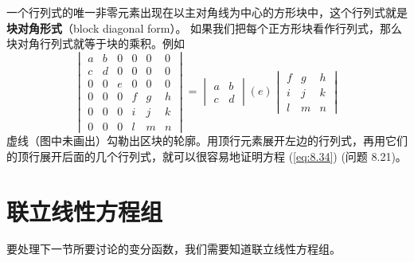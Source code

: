     一个行列式的唯一非零元素出现在以主对角线为中心的方形块中，这个行列式就是\textbf{块对角形式}（block diagonal form）。 如果我们把每个正方形块看作行列式，那么块对角行列式就等于块的乘积。例如
    \begin{equation}
        \begin{vmatrix}
            a & b & 0 & 0 & 0 & 0 \\
            c & d & 0 & 0 & 0 & 0 \\
            0 & 0 & e & 0 & 0 & 0 \\
            0 & 0 & 0 & f & g & h \\
            0 & 0 & 0 & i & j & k \\
            0 & 0 & 0 & l & m & n
        \end{vmatrix} = \begin{vmatrix}
            a & b \\
            c & d
        \end{vmatrix} \left(e\right)\begin{vmatrix}
            f & g & h \\
            i & j & k \\
            l & m & n
        \end{vmatrix}
        \label{eq:8.34}
    \end{equation}
    虚线（图中未画出）勾勒出区块的轮廓。用顶行元素展开左边的行列式，再用它们的顶行展开后面的几个行列式，就可以很容易地证明方程 (\ref{eq:8.34}) (问题 8.21)。

\section{联立线性方程组}
\label{sec:8.4 Simultaneous Linear Equations}
    要处理下一节所要讨论的变分函数，我们需要知道联立线性方程组。

